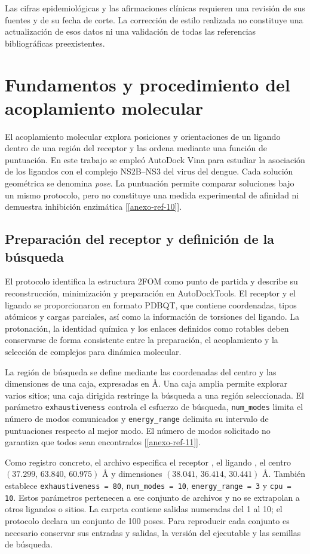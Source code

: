 \documentclass[12 pt, letter, oneside]{book}
\begin{document}
Las cifras epidemiológicas y las afirmaciones clínicas requieren una revisión de sus fuentes y de su fecha de corte. La corrección de estilo realizada no constituye una actualización de esos datos ni una validación de todas las referencias bibliográficas preexistentes.


\chapter{Fundamentos y procedimiento del acoplamiento molecular}
\label{ap:acoplamiento-vina}

El acoplamiento molecular explora posiciones y orientaciones de un ligando dentro de una región del receptor y las ordena mediante una función de puntuación. En este trabajo se empleó AutoDock Vina para estudiar la asociación de los ligandos con el complejo NS2B--NS3 del virus del dengue. Cada solución geométrica se denomina \textit{pose}. La puntuación permite comparar soluciones bajo un mismo protocolo, pero no constituye una medida experimental de afinidad ni demuestra inhibición enzimática [\ref{anexo-ref-10}].

\section{Preparación del receptor y definición de la búsqueda}
El protocolo identifica la estructura 2FOM como punto de partida y describe su reconstrucción, minimización y preparación en AutoDockTools. El receptor y el ligando se proporcionaron en formato PDBQT, que contiene coordenadas, tipos atómicos y cargas parciales, así como la información de torsiones del ligando. La protonación, la identidad química y los enlaces definidos como rotables deben conservarse de forma consistente entre la preparación, el acoplamiento y la selección de complejos para dinámica molecular.

La región de búsqueda se define mediante las coordenadas del centro y las dimensiones de una caja, expresadas en Å. Una caja amplia permite explorar varios sitios; una caja dirigida restringe la búsqueda a una región seleccionada. El parámetro \texttt{exhaustiveness} controla el esfuerzo de búsqueda, \texttt{num\_modes} limita el número de modos comunicados y \texttt{energy\_range} delimita su intervalo de puntuaciones respecto al mejor modo. El número de modos solicitado no garantiza que todos sean encontrados [\ref{anexo-ref-11}].

Como registro concreto, el archivo  especifica el receptor , el ligando , el centro $(37.299,\,63.840,\,60.975)$ Å y dimensiones $(38.041,\,36.414,\,30.441)$ Å. También establece \texttt{exhaustiveness = 80}, \texttt{num\_modes = 10}, \texttt{energy\_range = 3} y \texttt{cpu = 10}. Estos parámetros pertenecen a ese conjunto de archivos y no se extrapolan a otros ligandos o sitios. La carpeta contiene salidas numeradas del 1 al 10; el protocolo declara un conjunto de 100 poses. Para reproducir cada conjunto es necesario conservar sus entradas y salidas, la versión del ejecutable y las semillas de búsqueda.
\end{document}
